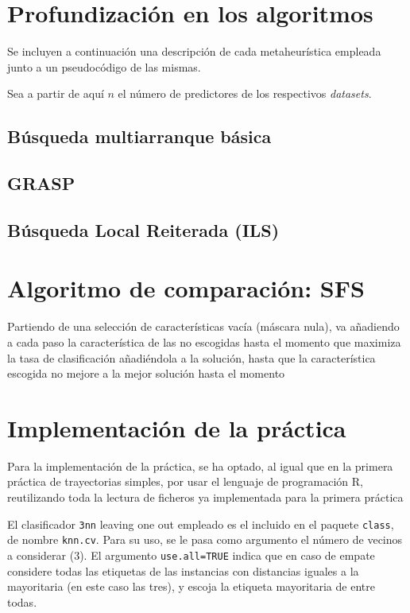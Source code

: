 \documentclass[a4paper,11pt]{article}
\begin{document}
\newpage
\section{Profundización en los algoritmos}
Se incluyen a continuación una descripción de cada metaheurística empleada junto a un pseudocódigo de las mismas.

Sea a partir de aquí $n$ el número de predictores de los respectivos \textit{datasets}.
\subsection{Búsqueda multiarranque básica}

\small{\texttt{}}
\normalsize

\subsection{GRASP}

\small{\texttt{}}
\normalsize

\subsection{Búsqueda Local Reiterada (ILS)}

\small{\texttt{}}
\normalsize

\section{Algoritmo de comparación: SFS}
\small{\texttt{}}

Partiendo de una selección de características vacía (máscara nula), va añadiendo a cada paso la característica
de las no escogidas hasta el momento que maximiza la tasa de clasificación añadiéndola a la solución, hasta
que la característica escogida no mejore a la mejor solución hasta el momento

\section{Implementación de la práctica}
Para la implementación de la práctica, se ha optado, al igual que en la primera práctica de trayectorias simples,
por usar el lenguaje de programación R, reutilizando toda la lectura de ficheros ya implementada para la primera práctica

El clasificador \texttt{3nn} leaving one out empleado es el incluido en el paquete \texttt{class}, de nombre
\texttt{knn.cv}. Para su uso, se le pasa como argumento el número de vecinos a considerar (3). El argumento 
\texttt{use.all=TRUE} indica que en caso de empate considere todas las etiquetas de las instancias con distancias 
iguales a la mayoritaria (en este caso las tres), y escoja la etiqueta mayoritaria de entre todas. 
\end{document}
